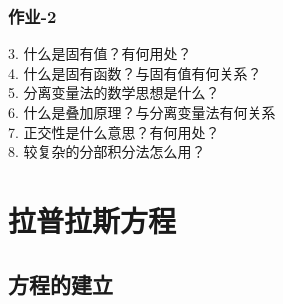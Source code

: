 \begin{frame}
	\frametitle{作业-2}
	3. 什么是固有值？有何用处？
	\\
	4. 什么是固有函数？与固有值有何关系？ 
	\\
	5. 分离变量法的数学思想是什么？
	\\
	6. 什么是叠加原理？与分离变量法有何关系
	\\
	7. 正交性是什么意思？有何用处？
	\\
	8. 较复杂的分部积分法怎么用？	
\end{frame}	


\section{拉普拉斯方程}
\subsection{方程的建立}
